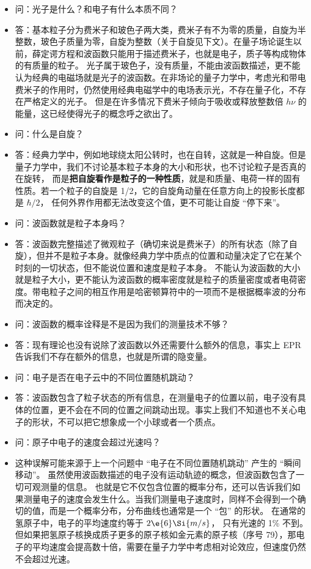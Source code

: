\begin{itemize}
\item 问：光子是什么？和电子有什么本质不同？
\item 答：基本粒子分为费米子和玻色子两大类，费米子有不为零的质量，自旋为半整数，玻色子质量为零，自旋为整数（关于自旋见下文）。在量子场论诞生以前，薛定谔方程和波函数只能用于描述费米子，也就是电子，质子等构成物体的有质量的粒子。 光子属于玻色子，没有质量，不能由波函数描述，更不能认为经典的电磁场就是光子的波函数。在非场论的量子力学中，考虑光和带电费米子的作用时，仍然使用经典电磁学中的电场表示光，不存在量子化，不存在严格定义的光子。 但是在许多情况下费米子倾向于吸收或释放整数倍 $h\nu$ 的能量，这已经使得光子的概念呼之欲出了。
\item 问：什么是自旋？
\item 答：经典力学中，例如地球绕太阳公转时，也在自转，这就是一种自旋。但是量子力学中，我们不讨论基本粒子本身的大小和形状，也不讨论粒子是否真的在旋转， 而是\textbf{把自旋看作是粒子的一种性质}，就是和质量、电荷一样的固有性质。若一个粒子的自旋是 1/2，它的自旋角动量在任意方向上的投影长度都是 $\hbar/2$， 任何外界作用都无法改变这个值，更不可能让自旋 “停下来”。
\item 问：波函数就是粒子本身吗？
\item 答：波函数完整描述了微观粒子（确切来说是费米子）的所有状态（除了自旋），但并不是粒子本身。就像经典力学中质点的位置和动量决定了它在某个时刻的一切状态，但不能说位置和速度是粒子本身。 不能认为波函数的大小就是粒子大小，更不能认为波函数的概率密度就是粒子的质量密度或者电荷密度。带电粒子之间的相互作用是哈密顿算符中的一项而不是根据概率波的分布而决定的。

\item 问：波函数的概率诠释是不是因为我们的测量技术不够？

\item 答：现有理论也没有说除了波函数以外还需要什么额外的信息，事实上 EPR 告诉我们不存在额外的信息，也就是所谓的隐变量。

\item 问：电子是否在电子云中的不同位置随机跳动？

\item 答：波函数包含了粒子状态的所有信息，在测量电子的位置以前，电子没有具体的位置，更不会在不同的位置之间跳动出现。事实上我们不知道也不关心电子的形状，不可以把它想象成一个小球或者一个质点。

\item 问：原子中电子的速度会超过光速吗？

\item 这种误解可能来源于上一个问题中 “电子在不同位置随机跳动” 产生的 “瞬间移动”。 虽然使用波函数描述的电子没有运动轨迹的概念，但波函数包含了一切可观测量的信息。 也就是它不仅包含位置的概率分布，还可以告诉我们如果测量电子的速度会发生什么。当我们测量电子速度时，同样不会得到一个确切的值，而是一个概率分布，分布曲线也通常是一个 “包” 的形状。 在通常的氢原子中，电子的平均速度约等于 $2\e{6}\Si{m/s}$， 只有光速的 1\% 不到。 但如果把氢原子核换成质子更多的原子核如金元素的原子核（序号 79），那电子的平均速度会提高数十倍，需要在量子力学中考虑相对论效应，但速度仍然不会超过光速。


\end{itemize}
